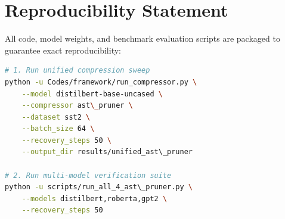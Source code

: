 \section{Reproducibility Statement}
All code, model weights, and benchmark evaluation scripts are packaged to guarantee exact reproducibility:
\begin{lstlisting}[language=bash]
# 1. Run unified compression sweep
python -u Codes/framework/run_compressor.py \
    --model distilbert-base-uncased \
    --compressor ast\_pruner \
    --dataset sst2 \
    --batch_size 64 \
    --recovery_steps 50 \
    --output_dir results/unified_ast\_pruner

# 2. Run multi-model verification suite
python -u scripts/run_all_4_ast\_pruner.py \
    --models distilbert,roberta,gpt2 \
    --recovery_steps 50
\end{lstlisting}
